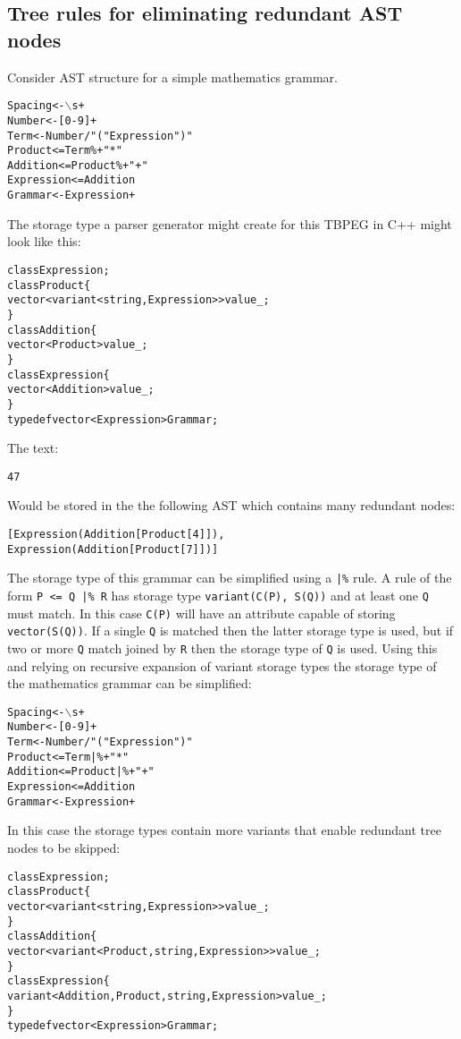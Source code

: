 \documentclass[a4paper,11pt]{article}
\begin{document}
\subsection{Tree rules for eliminating redundant AST nodes}
Consider AST structure for a simple mathematics grammar.
\begin{alltt}
    Spacing    <- \(\backslash\)s+
    Number     <- [0-9]+
    Term       <- Number / "(" Expression ")"
    Product    <= Term \%+ "*"
    Addition   <= Product \%+ "+"
    Expression <= Addition
    Grammar    <- Expression+
\end{alltt}

The storage type a parser generator might create for this TBPEG in C++ might look like this:
\begin{alltt}
    class Expression;
    class Product \{
         vector< variant<string, Expression> > value\_;
    \}
    class Addition \{
         vector<Product> value\_;
    \}
    class Expression \{
        vector<Addition> value\_;
    \}
    typedef vector<Expression> Grammar;
\end{alltt}

The text:
\begin{alltt}
    4 7
\end{alltt}

Would be stored in the the following AST which contains many redundant nodes:
\begin{alltt}
    [ Expression(Addition[Product[4]]),
      Expression(Addition[Product[7]]) ]
\end{alltt}

The storage type of this grammar can be simplified using a \verb+|%+ rule.
A rule of the form \verb+P <= Q |% R+ has storage type \verb+variant(C(P), S(Q))+ and at least one \verb+Q+ must match.
In this case \verb+C(P)+ will have an attribute capable of storing \verb+vector(S(Q))+.
If a single \verb+Q+ is matched then the latter storage type is used, but if two or more \verb+Q+ match joined by \verb+R+ then the storage type of \verb+Q+ is used.
Using this and relying on recursive expansion of variant storage types the storage type of the mathematics grammar can be simplified:
\begin{alltt}
    Spacing    <- \(\backslash\)s+
    Number     <- [0-9]+
    Term       <- Number / "(" Expression ")"
    Product    <= Term |\%+ "*"
    Addition   <= Product |\%+ "+"
    Expression <= Addition
    Grammar    <- Expression+
\end{alltt}

In this case the storage types contain more variants that enable redundant tree nodes to be skipped:
\begin{alltt}
    class Expression;
    class Product \{
        vector< variant<string, Expression> > value\_;
    \}
    class Addition \{
        vector< variant<Product, string, Expression> > value\_;
    \}
    class Expression \{
        variant<Addition, Product, string, Expression> value\_;
    \}
    typedef vector<Expression> Grammar;
\end{alltt}
\end{document}
